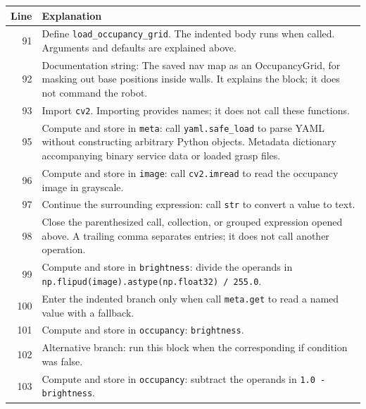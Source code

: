 \documentclass[11pt,a4paper]{book}
\begin{document}
\begin{longtable}{r p{}}

\textbf{Line} & \textbf{Explanation} \\ \hline \endhead

91 & Define \texttt{load\_occupancy\_grid}. The indented body runs when called. Arguments and defaults are explained above. \\

92 & Documentation string: The saved nav map as an OccupancyGrid, for masking out base positions inside walls. It explains the block; it does not command the robot. \\

93 & Import \texttt{cv2}. Importing provides names; it does not call these functions. \\

95 & Compute and store in \texttt{meta}: call \texttt{yaml.safe\_load} to parse YAML without constructing arbitrary Python objects. Metadata dictionary accompanying binary service data or loaded grasp files. \\

96 & Compute and store in \texttt{image}: call \texttt{cv2.imread} to read the occupancy image in grayscale.  \\

97 & Continue the surrounding expression: call \texttt{str} to convert a value to text. \\

98 & Close the parenthesized call, collection, or grouped expression opened above. A trailing comma separates entries; it does not call another operation. \\

99 & Compute and store in \texttt{brightness}: divide the operands in \texttt{np.flipud(image).astype(np.float32) / 255.0}.  \\

100 & Enter the indented branch only when call \texttt{meta.get} to read a named value with a fallback. \\

101 & Compute and store in \texttt{occupancy}: \texttt{brightness}.  \\

102 & Alternative branch: run this block when the corresponding if condition was false. \\

103 & Compute and store in \texttt{occupancy}: subtract the operands in \texttt{1.0 - brightness}.  \\


\end{longtable}
\end{document}
